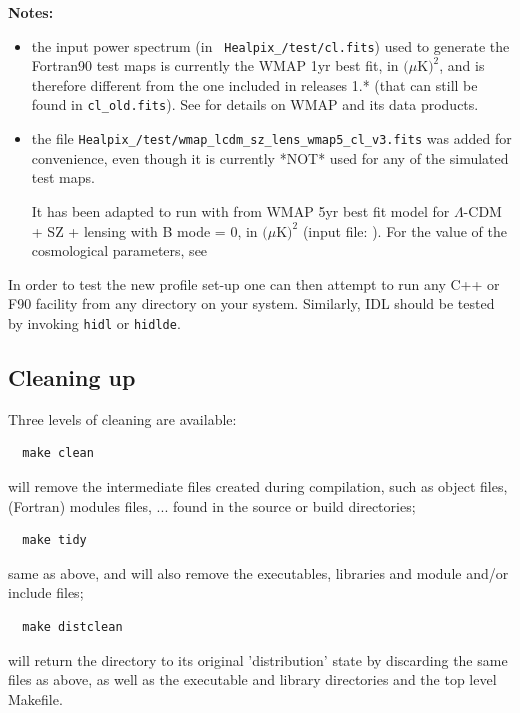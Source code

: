 \documentclass[12pt,twoside]{article}
\begin{document}
{\bf{Notes:}} 
\begin{itemize}
\item the input power spectrum (in {\tt
Healpix\_\hpxversion/test/cl.fits}) used to generate the Fortran90 test maps
is currently the WMAP 1yr best fit, in $(\mu$K$)^2$, and is therefore different from the one
included in releases 1.* (that can still be found in {\tt cl\_old.fits}).
See  
for details on WMAP and its data products.
%
\item the file  {\tt Healpix\_\hpxversion/test/wmap\_lcdm\_sz\_lens\_wmap5\_cl\_v3.fits}
 was added for convenience, even though
 it is currently *NOT* used for any of the simulated test maps.

 It has been adapted to run with \healpix  from WMAP 5yr best fit model for
$\Lambda$-CDM + SZ + lensing with B mode = 0, in $(\mu$K$)^2$ (input file: 
).
 For the value of the cosmological parameters, see 
\end{itemize}

In order to test the new \healpix profile set-up one can then attempt
to run any C++ or F90 facility from any directory on your system. Similarly,
IDL should be tested by invoking {\tt hidl} or {\tt hidlde}.



\subsection{Cleaning up}
Three levels of cleaning are available:
\begin{verbatim}
  make clean
\end{verbatim}
will remove the intermediate files created during compilation, such as object
files, (Fortran) modules files, ... found in the source or build directories;
\begin{verbatim}
  make tidy
\end{verbatim}
same as above, and will also remove the \healpix executables, libraries and module and/or
include files;
\begin{verbatim}
  make distclean
\end{verbatim}
will return the \healpix directory to its original 'distribution' state by discarding the same
files as above, as well as the executable and library directories and the top
level Makefile.
\end{document}
